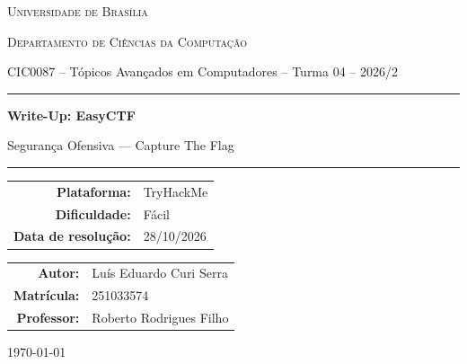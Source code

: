 \documentclass[12pt,a4paper]{article}
\newcommand{\desafioNome}{EasyCTF}
\newcommand{\plataforma}{TryHackMe}
\newcommand{\dificuldade}{Fácil}
\newcommand{\dataResolucao}{28/10/2026}
\newcommand{\autorNome}{Luís Eduardo Curi Serra}
\newcommand{\materia}{CIC0087 -- Tópicos Avançados em Computadores -- Turma 04 -- 2026/2}
\newcommand{\departamento}{Departamento de Ciências da Computação}
\newcommand{\matricula}{251033574}
\newcommand{\professor}{Roberto Rodrigues Filho}
\newcommand{\universidade}{Universidade de Brasília}
\begin{document}
\begin{titlepage}
  \thispagestyle{empty}
  \centering
  {\scshape \universidade \par}
  {\scshape \departamento \par}
  \vspace{0.4cm}
  {\small \materia \par}
  \vspace{2.5cm}

  \rule{\linewidth}{0.4pt}\par
  \vspace{0.6cm}
  {\huge \bfseries Write-Up: \desafioNome \par}
  \vspace{0.4cm}
  {\large Segurança Ofensiva --- Capture The Flag \par}
  \vspace{0.6cm}
  \rule{\linewidth}{0.4pt}\par

  \vspace{2.0cm}
  \begin{tabular}{rl}
    \textbf{Plataforma:}       & \plataforma       \\[4pt]
    \textbf{Dificuldade:}      & \dificuldade      \\[4pt]
    \textbf{Data de resolução:}& \dataResolucao    \\
  \end{tabular}

  \vfill

  \begin{tabular}{rl}
    \textbf{Autor:}     & \autorNome  \\[4pt]
    \textbf{Matrícula:} & \matricula  \\[4pt]
    \textbf{Professor:} & \professor  \\
  \end{tabular}

  \vspace{1.2cm}
  {\small \today \par}
\end{titlepage}

\newpage
\tableofcontents
\thispagestyle{fancy}
\newpage

\end{document}

